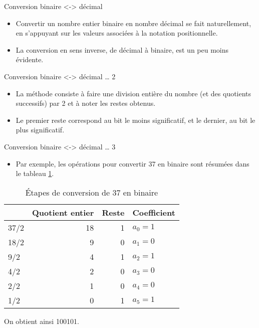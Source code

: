 \documentclass[presentation]{beamer}
\begin{document}
\begin{frame}[label={sec:orgb511d3a}]{Conversion binaire <-> décimal}
\begin{itemize}
\item Convertir un nombre entier binaire en nombre décimal se fait naturellement, en s'appuyant sur les valeurs associées à la notation positionnelle.

\item La conversion en sens inverse, de décimal à binaire, est un peu moins évidente.
\end{itemize}
\end{frame}

\begin{frame}[label={sec:org57c1cea}]{Conversion binaire <-> décimal \ldots{} 2}
\begin{itemize}
\item La méthode consiste à faire une division entière du nombre (et des quotients successifs) par 2 et à noter les restes obtenus.

\item Le premier reste correspond au bit le moins significatif, et le dernier, au bit le plus significatif.
\end{itemize}
\end{frame}

\begin{frame}[label={sec:orga88dd04}]{Conversion binaire <-> décimal \ldots{} 3}
\begin{itemize}
\item Par exemple, les opérations pour convertir 37 en binaire sont résumées dans le tableau \ref{tab:orgd1ad5ef}.
\end{itemize}

\begin{table}[htbp]
\caption{\label{tab:orgd1ad5ef}Étapes de conversion de 37 en binaire}
\centering
\begin{tabular}{lrrl}
 & Quotient entier & Reste & Coefficient\\[0pt]
\hline
37/2 & 18 & 1 & \(a_0 = 1\)\\[0pt]
18/2 & 9 & 0 & \(a_1 = 0\)\\[0pt]
9/2 & 4 & 1 & \(a_2 = 1\)\\[0pt]
4/2 & 2 & 0 & \(a_3 = 0\)\\[0pt]
2/2 & 1 & 0 & \(a_4 = 0\)\\[0pt]
1/2 & 0 & 1 & \(a_5 = 1\)\\[0pt]
\end{tabular}
\end{table}

On obtient ainsi 100101.
\end{frame}
\end{document}
